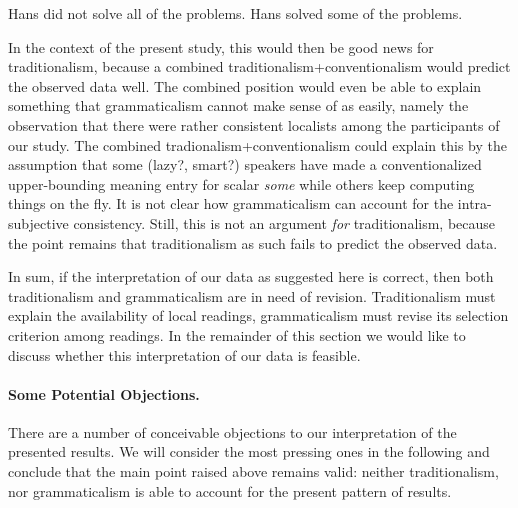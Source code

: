 \documentclass[fleqn,reqno,10pt,draft]{article}
\begin{document}
\begin{exe}
  \ex \label{bsp:indirect-SI}
    \begin{xlist}
      \ex \label{bsp:indirect-SI-Target} Hans did not solve all of the problems.
      \ex \label{bsp:indirect-SI-Inference} Hans solved some of the problems.
    \end{xlist}
\end{exe}

\noindent In the context of the present study, this would then be good
news for traditionalism, because a combined
traditionalism+conventionalism would predict the observed data
well. The combined position would even be able to explain something
that grammaticalism cannot make sense of as easily, namely the
observation that there were rather consistent localists among the
participants of our study. The combined tradionalism+conventionalism
could explain this by the assumption that some (lazy?, smart?)
speakers have made a conventionalized upper-bounding meaning entry for
scalar \emph{some} while others keep computing things on the fly. It
is not clear how grammaticalism can account for the intra-subjective
consistency. Still, this is not an argument \emph{for} traditionalism,
because the point remains that traditionalism as such fails to predict
the observed data.
  

In sum, if the interpretation of our data as suggested here is
correct, then both traditionalism and grammaticalism are in need of
revision. Traditionalism must explain the availability of local
readings, grammaticalism must revise its selection criterion among
readings. In the remainder of this section we would like to discuss
whether this interpretation of our data is feasible.

\paragraph{Some Potential Objections.} There are a number of
conceivable objections to our interpretation of the presented
results. We will consider the most pressing ones in the following and
conclude that the main point raised above remains valid: neither
traditionalism, nor grammaticalism is able to account for the present
pattern of results.
\end{document}
